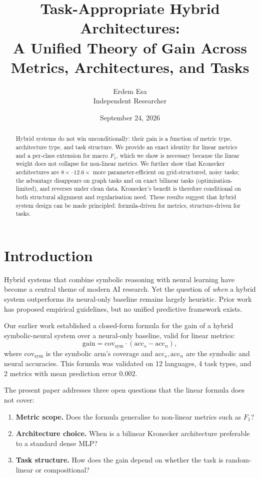 \documentclass[11pt,a4paper]{article}
\title{Task-Appropriate Hybrid Architectures:\\
A Unified Theory of Gain Across Metrics, Architectures, and Tasks}
\author{Erdem Esa\\ \small Independent Researcher}
\date{September 24, 2026}
\begin{document}
\maketitle

\begin{abstract}
Hybrid systems do not win unconditionally: their gain is a function of
metric type, architecture type, and task structure. We provide an exact
identity for linear metrics and a per-class extension for macro $F_1$,
which we show is necessary because the linear weight does not collapse
for non-linear metrics. We further show that Kronecker architectures are
$8\times$--$12.6\times$ more parameter-efficient on grid-structured,
noisy tasks; the advantage disappears on graph tasks and on exact
bilinear tasks (optimisation-limited), and reverses under clean data.
Kronecker's benefit is therefore conditional on both structural
alignment and regularisation need. These results suggest that hybrid system
design can be made principled: formula-driven for metrics,
structure-driven for tasks.
\end{abstract}


\section{Introduction}
\label{sec:intro}

Hybrid systems that combine symbolic reasoning with neural learning have
become a central theme of modern AI research. Yet the question of
\emph{when} a hybrid system outperforms its neural-only baseline remains
largely heuristic. Prior work has proposed empirical guidelines, but no
unified predictive framework exists.

Our earlier work \cite{esa2026preprint1} established a closed-form
formula for the gain of a hybrid symbolic-neural system over a neural-only
baseline, valid for linear metrics:
\begin{equation}
\text{gain} = \text{cov}_{\text{sym}} \cdot (\text{acc}_s - \text{acc}_n),
\label{eq:linear}
\end{equation}
where $\text{cov}_{\text{sym}}$ is the symbolic arm's coverage and
$\text{acc}_s, \text{acc}_n$ are the symbolic and neural accuracies.
This formula was validated on 12 languages, 4 task types, and 2 metrics
with mean prediction error $0.002$.

The present paper addresses three open questions that the linear formula
does not cover:

\begin{enumerate}
\item \textbf{Metric scope.} Does the formula generalise to non-linear
metrics such as $F_1$?
\item \textbf{Architecture choice.} When is a bilinear Kronecker
architecture preferable to a standard dense MLP?
\item \textbf{Task structure.} How does the gain depend on whether the
task is random-linear or compositional?
\end{enumerate}
\end{document}
